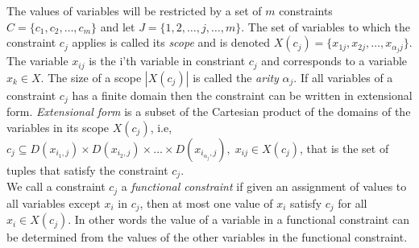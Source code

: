The values of variables will be restricted by a set of $m$ constraints $C= \{ c_1,c_2, \dots , c_m \} $ and let $J = 
\{1,2,\dots,j,\dots , m\}$. The set of 
variables to which the constraint $c_j$ applies is called its \emph{scope} and is denoted 
$X(c_j) = \{x_{1j}, x_{2j} , \dots , x_{\alpha_jj}\}$. The variable $x_ {ij}$ is the i'th variable in constriant $c_j$ 
and corresponds to a variable $x_k\in X$.  
The size of a scope $|X(c_j)|$ is called the \emph{arity} $\alpha_j$. If all variables of a constraint $c_j$ has a 
finite domain then the constraint can be written in extensional form. \emph{Extensional form} is a 
subset of the Cartesian product of the domains of the variables in its scope $X(c_j)$, i.e, $c_j \subseteq 
D(x_{i_1,j}) \times D(x_{i_2,j}) \times \dots \times D(x_{i_{\alpha_j},j}), \; x_{ij} \in X(c_j)$, that is the set 
of tuples that satisfy the constraint $c_j$. \\
We call a constraint $c_j$ a \emph{functional constraint} if given an assignment of values to all variables except 
$x_i$ in $c_j$, then at most one value of $x_i$ satisfy $c_j$ for all $x_i \in X(c_j)$. In other words the value of a 
variable in a functional constraint can be determined from the values of the other variables in the functional 
constraint.

\iffalse
